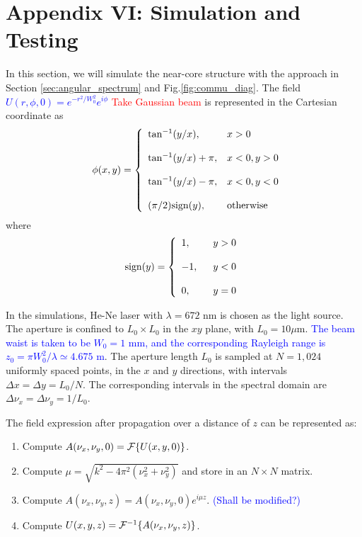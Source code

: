 \section*{Appendix VI: Simulation and Testing}

In this section, we will simulate the near-core structure with the approach in Section \ref{sec:angular_spectrum}
and Fig.\ref{fig:commu_diag}. 
The field \textcolor{blue}{$U(r, \phi, 0) = e^{-r^2/W_0^2} e^{i \phi}$} \textcolor{red}{Take Gaussian beam}
is represented in the Cartesian coordinate as
\begin{eqnarray}
	&&\phi(x, y) = \left\{
	\begin{array}{ll}
		\tan^{-1}(y/x), & x > 0 \\ & \\
		\tan^{-1}(y/x) + \pi, & x < 0, y > 0 \\ & \\
		\tan^{-1}(y/x) - \pi, & x < 0, y < 0 \\ & \\
		(\pi/2) {\rm sign}(y), & {\rm otherwise}
	\end{array}
	\right.
\end{eqnarray}
where 
\begin{eqnarray}
	{\rm sign}(y) = \left\{
	\begin{array}{ll}
		1, \hspace{0.2in}	& y > 0 \\ & \\
		-1,		& y < 0 \\ & \\
		0,		& y = 0
	\end{array}
	\right.
\end{eqnarray}

In the simulations, He-Ne laser with $\lambda = 672$ nm is chosen as the light source.
The aperture is confined to $L_0 \times L_0$ in the $xy$ plane, with $L_0 = 10 \mu$m.
\textcolor{blue}{The beam waist is taken to be $W_0 = 1$ mm, and the corresponding Rayleigh range is $z_0 = \pi W_0^2/ \lambda \simeq 4.675$ m}.
The aperture length $L_0$ is sampled at $N = 1,024$ uniformly spaced points, in the $x$ and $y$ directions, 
with intervals $\Delta x = \Delta y = L_0 / N$.
The corresponding intervals in the spectral domain are $\Delta \nu_x = \Delta \nu_y = 1 / L_0$.

The field expression after propagation over a distance of $z$ can be represented as:
\begin{enumerate}
	\item Compute $A(\nu_x, \nu_y, 0) = {\cal F} \{ U(x, y, 0) \}$.
	\item Compute $\mu = \sqrt{ k^ 2 - 4 \pi^2 (\nu_x^2 + \nu_y^2)}$ and store in an $N \times N$ matrix.
	\item Compute $A(\nu_x, \nu_y, z) = A(\nu_x, \nu_y, 0) e^{i \mu z}$. \textcolor{blue}{(Shall be modified?)}
	\item Compute $U(x, y, z) = {\cal F}^{-1} \{A(\nu_x, \nu_y, z)\}$.
\end{enumerate}

